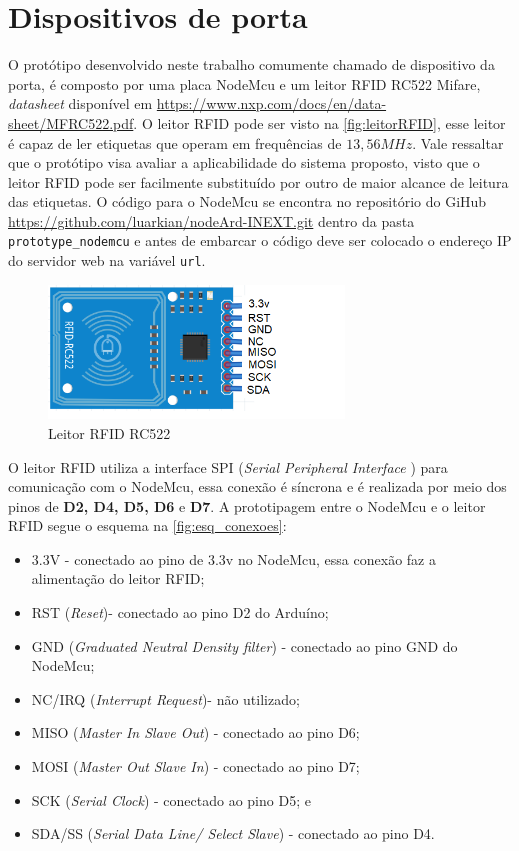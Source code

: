 \section{Dispositivos de porta}

O protótipo desenvolvido neste trabalho comumente chamado de dispositivo da porta, é composto por uma placa NodeMcu e um leitor RFID RC522 Mifare, \textit{datasheet} disponível em \url{https://www.nxp.com/docs/en/data-sheet/MFRC522.pdf}.  %
O leitor RFID pode ser visto na \autoref{fig:leitorRFID}, esse leitor é capaz de ler etiquetas que operam em
frequências de $13,56MHz$. 
% 
Vale ressaltar que o protótipo visa avaliar a aplicabilidade do sistema proposto, visto que o leitor RFID pode ser facilmente substituído por outro de maior alcance de leitura das etiquetas.
% 
O código para o NodeMcu se encontra no repositório do GiHub \url{https://github.com/luarkian/nodeArd-INEXT.git} dentro da pasta \texttt{prototype\_nodemcu} e antes de embarcar o código deve ser colocado o endereço IP do servidor web na variável \texttt{url}.
\begin{figure}[H]
              \caption{\label{fig:leitorRFID}{Leitor RFID RC522}}
              \centering
              \includegraphics[width=0.7\textwidth]{Figuras/rfid_rc522.PNG}
\end{figure}

\par
O leitor RFID utiliza a interface SPI (\textit{Serial Peripheral Interface} ) para comunicação com o NodeMcu,
essa conexão é síncrona e é realizada por meio dos pinos de \textbf{D2, D4, D5, D6} e \textbf{D7}. A prototipagem entre o NodeMcu e o leitor RFID
segue o esquema na \autoref{fig:esq_conexoes}:

\begin{itemize}
    \item 3.3V - conectado ao pino de 3.3v no NodeMcu, essa conexão faz a alimentação do leitor RFID;
    \item RST (\textit{Reset})- conectado ao pino D2 do Arduíno;
    \item GND (\textit{Graduated Neutral Density filter}) - conectado ao pino GND do NodeMcu;
    \item NC/IRQ (\textit{Interrupt Request})- não utilizado;
    \item MISO (\textit{Master In Slave Out}) - conectado ao pino D6;
    \item MOSI  (\textit{Master Out Slave In}) - conectado ao pino D7;
    \item SCK  (\textit{Serial Clock}) - conectado ao pino D5; e
    \item SDA/SS (\textit{Serial Data Line/ Select Slave}) - conectado ao pino D4.
\end{itemize}

